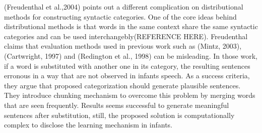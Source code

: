 (Freudenthal et al.,2004) points out a different complication on distributional
methods for constructing syntactic categories. One of the core ideas behind
distributional methods is that words in the same context share the same
syntactic categories and can be used interchangebly(REFERENCE HERE).
Freudenthal claims that evaluation methods used in previous work such as
(Mintz, 2003), (Cartwright, 1997) and (Redington et al., 1998) can be
misleading. In those work, if a word is substituted with another one in its
category, the resulting sentences erronous in a way that are not observed in
infants speech. As a success criteria, they argue that proposed categorization
should generate plausible sentences. They introduce chunking mechanism to
overcome this problem by merging  words that are seen frequently. Results seems
successful to generate meaningful sentences after substitution, still, the
proposed solution is computationally complex to disclose the learning mechanism
in infants.


